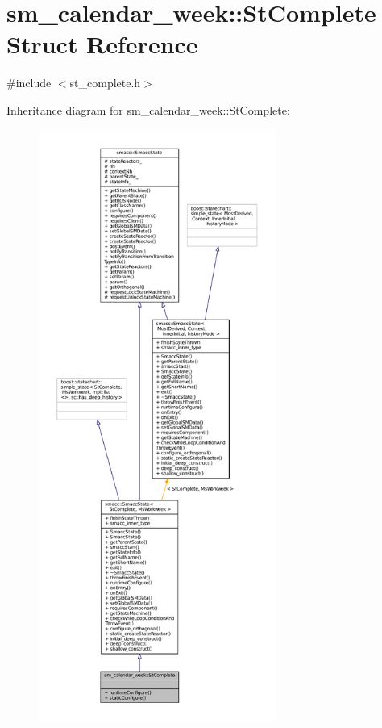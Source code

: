 \hypertarget{structsm__calendar__week_1_1StComplete}{}\section{sm\+\_\+calendar\+\_\+week\+:\+:St\+Complete Struct Reference}
\label{structsm__calendar__week_1_1StComplete}


{\ttfamily \#include $<$st\+\_\+complete.\+h$>$}



Inheritance diagram for sm\+\_\+calendar\+\_\+week\+:\+:St\+Complete\+:
\nopagebreak
\begin{figure}[H]
\begin{center}
\leavevmode
\includegraphics[height=550pt]{structsm__calendar__week_1_1StComplete__inherit__graph}
\end{center}
\end{figure}


